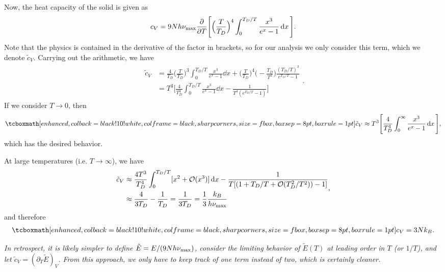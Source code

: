 {Now, the heat capacity of the solid is given as
\begin{eqnarray}
    c_{V} = 9 N h \nu_{\rm max} \pdv{T} \Bigg[ \Big( \frac{T}{T_{D}} \Big)^{4} \int_{0}^{T_{D}/T}\frac{x^3}{e^{x} - 1} \dd{x} \Bigg]
.\end{eqnarray}
Note that the physics is contained in the derivative of the factor in brackets, so for our analysis we only consider this term, which we denote $\tilde{c}_{V}$.
Carrying out the arithmetic, we have 
\begin{eqnarray}
   \begin{aligned}
       \tilde{c}_{V} &= \frac{4}{T_{D}} \Big( \frac{T}{T_{D}} \Big)^{3} \int_{0}^{T_{D}/T} \frac{x^3}{e^{x} - 1} \dd{x} + \Big( \frac{T}{T_{D}} \Big)^{4} \Big( -\frac{T_{D}}{T^2} \Big) \frac{(T_{D}/T)^3}{e^{T_{D}/T} - 1} \\
                     &= T^3 \Bigg[ \frac{4}{T_{D}^{4}} \int_{0}^{T_{D}/T} \frac{x^{3}}{e^{x} - 1} \dd{x} - \frac{1}{T^{4}(e^{T_{D}/T} - 1)} \Bigg]
   \end{aligned} 
.\end{eqnarray}
If we consider $T \rightarrow 0$, then
\begin{eqnarray}
    \eqbox{ \tilde{c}_{V} \approx T^3 \Bigg[ \frac{4}{T_{D}^{4}} \int_{0}^{\infty} \frac{x^3}{e^{x} - 1} \dd{x} \Bigg] }
,\end{eqnarray}
which has the desired behavior.

At large temperatures (i.e. $T \rightarrow \infty$), we have
\begin{eqnarray}
    \begin{aligned}
        \tilde{c}_{V} &\approx \frac{4T^3}{T_{D}^{4}} \int_{0}^{T_{D}/T} [x^2 + {\cal O}(x^3)] \dd{x} - \frac{1}{T[ (1 + T_{D}/T + {\cal O}(T_{D}^2/T^2)) - 1 ]} \\
                      &\approx \frac{4}{3 T_{D}} - \frac{1}{T_{D}} = \frac{1}{3 T_{D}} = \frac{1}{3} \frac{k_{B}}{h \nu_{\rm max}}
    \end{aligned}
,\end{eqnarray}
and therefore
\begin{eqnarray}
    \eqbox{ c_{V} = 3 N k_{B} }
.\end{eqnarray}

\textit{ In retrospect, it is likely simpler to define $\tilde{E} = E/(9 N h \nu_{\rm max})$, consider the limiting behavior of $\tilde{E}(T)$ at leading order in $T$ (or $1/T$), and let $\tilde{c}_{V} = (\partial_{T} \tilde{E})_{V}$.
From this approach, we only have to keep track of one term instead of two, which is certainly cleaner. }


}


